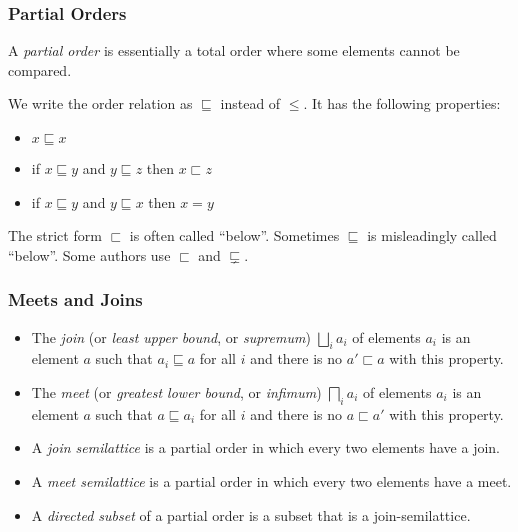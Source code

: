 \documentclass{beamer}
\begin{document}
\begin{frame}
  \frametitle{Partial Orders}
  A \emph{partial order} is essentially a total order where some
  elements cannot be compared.

  We write the order relation as $\sqsubseteq$ instead of $\leq$.  It
  has the following properties:
  \begin{itemize}
    \item $x \sqsubseteq x$
    \item if $x \sqsubseteq y$ and $y \sqsubseteq z$ then $x \sqsubset z$
    \item if $x \sqsubseteq y$ and $y \sqsubseteq x$ then $x = y$
  \end{itemize}
  The strict form $\sqsubset$ is often called ``below''.  Sometimes
  $\sqsubseteq$ is misleadingly called ``below''.  Some authors use
  $\sqsubset$ and $\sqsubsetneq$.
\end{frame}

\begin{frame}
  \frametitle{Meets and Joins}
  \begin{itemize}
    \item The \emph{join} (or \emph{least upper bound}, or
      \emph{supremum}) $\bigsqcup_ia_i$ of elements $a_i$ is an
      element $a$ such that $a_i \sqsubseteq a$ for all $i$ and there
      is no $a' \sqsubset a$ with this property.
    \item The \emph{meet} (or \emph{greatest lower bound}, or
      \emph{infimum}) $\bigsqcap_ia_i$ of elements $a_i$ is an element
      $a$ such that $a \sqsubseteq a_i$ for all $i$ and there is no $a
      \sqsubset a'$ with this property.
    \item A \emph{join semilattice} is a partial order in which every
      two elements have a join.
      \item A \emph{meet semilattice} is a partial order in which
        every two elements have a meet.
      \item A \emph{directed subset} of a partial order is a subset
        that is a join-semilattice.
  \end{itemize}
\end{frame}
\end{document}
